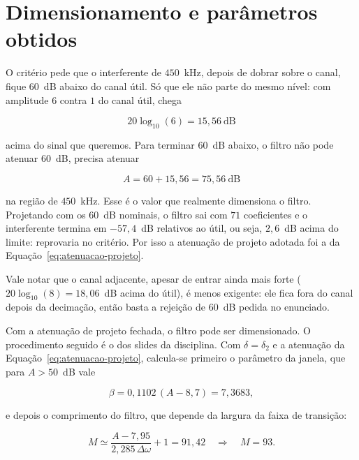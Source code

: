 \section{Dimensionamento e parâmetros obtidos}

O critério pede que o interferente de $450$~kHz, depois de dobrar sobre o canal, fique $60$~dB abaixo do canal útil. Só que ele não parte do mesmo nível: com amplitude $6$ contra $1$ do canal útil, chega

\begin{equation}
20\log_{10}(6) = 15{,}56 \ \mathrm{dB}
\end{equation}

acima do sinal que queremos. Para terminar $60$~dB abaixo, o filtro não pode atenuar $60$~dB, precisa atenuar

\begin{equation}
A = 60 + 15{,}56 = 75{,}56 \ \mathrm{dB}
\label{eq:atenuacao-projeto}
\end{equation}

na região de $450$~kHz. Esse é o valor que realmente dimensiona o filtro. Projetando com os $60$~dB nominais, o filtro sai com $71$ coeficientes e o interferente termina em $-57{,}4$~dB relativos ao útil, ou seja, $2{,}6$~dB acima do limite: reprovaria no critério. Por isso a atenuação de projeto adotada foi a da Equação~\eqref{eq:atenuacao-projeto}.

Vale notar que o canal adjacente, apesar de entrar ainda mais forte ($20\log_{10}(8) = 18{,}06$~dB acima do útil), é menos exigente: ele fica fora do canal depois da decimação, então basta a rejeição de $60$~dB pedida no enunciado.

Com a atenuação de projeto fechada, o filtro pode ser dimensionado. O procedimento seguido é o dos slides da disciplina. Com $\delta = \delta_2$ e a atenuação da Equação~\eqref{eq:atenuacao-projeto}, calcula-se primeiro o parâmetro da janela, que para $A > 50$~dB vale

\begin{equation}
\beta = 0{,}1102\,(A - 8{,}7) = 7{,}3683 ,
\end{equation}

e depois o comprimento do filtro, que depende da largura da faixa de transição:

\begin{equation}
M \simeq \frac{A - 7{,}95}{2{,}285\,\Delta\omega} + 1 = 91{,}42 \quad \Longrightarrow \quad M = 93 .
\end{equation}


